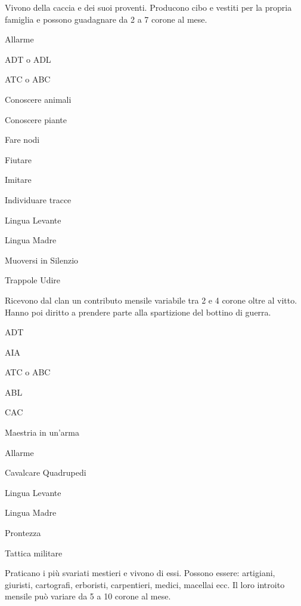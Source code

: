 
Vivono della caccia e dei suoi proventi. Producono cibo e vestiti per
la propria famiglia e possono guadagnare da 2 a 7 corone al mese.

\begin{abilist}
\item Allarme
\item ADT o ADL
\item ATC o ABC
\item Conoscere animali
\item Conoscere piante
\item Fare nodi
\item Fiutare
\item Imitare
\item Individuare tracce
\item Lingua Levante
\item Lingua Madre
\item Muoversi in Silenzio
\item Trappole Udire
\end{abilist}


Ricevono dal clan un contributo mensile variabile tra 2 e 4 corone
oltre al vitto. Hanno poi diritto a prendere parte alla spartizione
del bottino di guerra.

\begin{abilist}
\item ADT
\item AIA
\item ATC o ABC
\item ABL
\item CAC
\item Maestria in un'arma
\item Allarme
\item Cavalcare Quadrupedi
\item Lingua Levante
\item Lingua Madre
\item Prontezza
\item Tattica militare
\end{abilist}


Praticano i pi\`u svariati mestieri e vivono di essi. Possono essere:
artigiani, giuristi, cartografi, erboristi, carpentieri, medici,
macellai ecc. Il loro introito mensile pu\`o variare da 5 a 10 corone
al mese.

